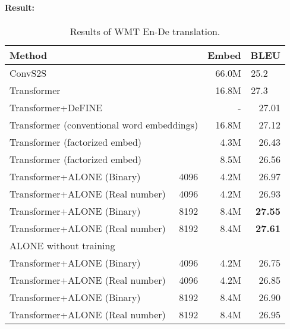 \documentclass{article}
\begin{document}
\paragraph{Result:}
\begin{table}[!t]
  \centering
  \caption{Results of WMT En-De translation.\label{tab:translation}}
  \begin{tabular}{| l | r | r | r |} \hline
  Method &  & Embed & BLEU \\ \hline
  \multicolumn{2}{|l|}{ConvS2S~\cite{pmlr-v70-gehring17a}} & 66.0M & 25.2 \ \ \\
  \multicolumn{2}{|l|}{Transformer~\cite{NIPS2017_7181}} & 16.8M & 27.3 \ \  \\
  \multicolumn{2}{|l|}{Transformer+DeFINE~\cite{factorizationInput}} & - & 27.01 \\ \hline
  \multicolumn{2}{|l|}{Transformer (conventional word embeddings)} & 16.8M & 27.12 \\
  \multicolumn{2}{|l|}{Transformer (factorized embed)} & 4.3M & 26.43 \\
  \multicolumn{2}{|l|}{Transformer (factorized embed)} & 8.5M & 26.56 \\ \hline
  Transformer+ALONE (Binary)      & 4096 & 4.2M & 26.97 \\
  Transformer+ALONE (Real number) & 4096 & 4.2M & 26.93 \\
  Transformer+ALONE (Binary)      & 8192 & 8.4M &\textbf{27.55} \\
  Transformer+ALONE (Real number) & 8192 & 8.4M &\textbf{27.61} \\ \hline
  \multicolumn{4}{|l|}{ALONE without training } \\ \hline
  Transformer+ALONE (Binary)      & 4096 & 4.2M & 26.75 \\
  Transformer+ALONE (Real number) & 4096 & 4.2M & 26.85 \\
  Transformer+ALONE (Binary)      & 8192 & 8.4M & 26.90 \\
  Transformer+ALONE (Real number) & 8192 & 8.4M & 26.95 \\ \hline  
  \end{tabular}
\end{table}
\end{document}
